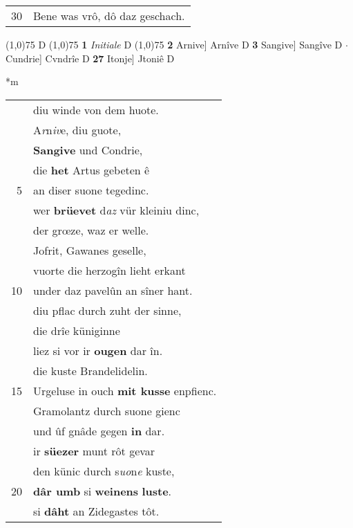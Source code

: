 \documentclass[8pt,a4paper,notitlepage]{article}
\begin{document}
\begin{table}[ht]
\begin{minipage}[t]{0.5\linewidth}
\begin{tabular}{rl}
30 & Bene was vrô, dô daz geschach.\\ 
\end{tabular}
\scriptsize
\line(1,0){75} \newline
D \newline
\line(1,0){75} \newline
\textbf{1} \textit{Initiale} D  \newline
\line(1,0){75} \newline
\textbf{2} Arnive] Arnîve D \textbf{3} Sangive] Sangîve D  $\cdot$ Cundrie] Cvndrîe D \textbf{27} Itonje] Jtoniê D \newline
\end{minipage}
\hspace{0.5cm}
\begin{minipage}[t]{0.5\linewidth}
\small
\begin{center}*m
\end{center}
\begin{tabular}{rl}
 & diu winde von dem huote.\\ 
 & A\textit{r}n\textit{iv}e, diu guote,\\ 
 & \textbf{Sangive} und Condrie,\\ 
 & die \textbf{het} Artus gebeten ê\\ 
5 & an diser suone tegedinc.\\ 
 & wer \textbf{brüevet} d\textit{az} vür kleiniu dinc,\\ 
 & der grœze, waz er welle.\\ 
 & Jofrit, Gawanes geselle,\\ 
 & vuorte die herzogîn lieht erkant\\ 
10 & under daz pavelûn an sîner hant.\\ 
 & diu pflac durch zuht der sinne,\\ 
 & die drîe küniginne\\ 
 & liez si vor ir \textbf{ougen} dar în.\\ 
 & die kuste Brandelidelin.\\ 
15 & Urgeluse in ouch \textbf{mit kusse} enpfienc.\\ 
 & Gramolantz durch suone gienc\\ 
 & und ûf gnâde gegen \textbf{in} dar.\\ 
 & ir \textbf{süezer} munt rôt gevar\\ 
 & den künic durch s\textit{uo}n\textit{e} kuste,\\ 
20 & \textbf{dâr umb} si \textbf{weinens} \textbf{luste}.\\ 
 & si \textbf{dâht} an Zidegastes tôt.\\ 

\end{tabular}
\end{minipage}
\end{table}
\end{document}
